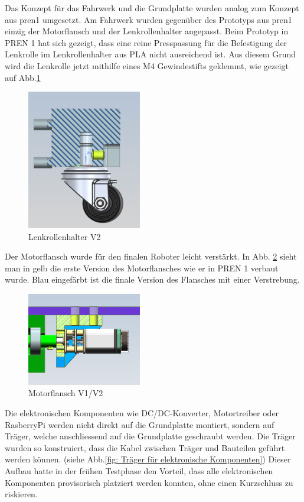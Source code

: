  Das Konzept für das Fahrwerk und die Grundplatte wurden analog zum Konzept aus \acrshort{pren1} umgesetzt. Am Fahrwerk wurden gegenüber des Prototyps aus \acrshort{pren1} einzig der Motorflansch und der Lenkrollenhalter angepasst. Beim Prototyp in PREN 1 hat sich gezeigt, dass eine reine Presspassung für die Befestigung der Lenkrolle im Lenkrollenhalter aus PLA nicht ausreichend ist. Aus diesem Grund wird die Lenkrolle jetzt mithilfe eines M4 Gewindestifts geklemmt, wie gezeigt auf Abb.\ref{fig: Lenkrollenhalter V2} 

\begin{figure}[H]
\centering
\includegraphics[width=5cm]{assets/MT/Lenkrollenhalter V2.png}
\caption{Lenkrollenhalter V2}
\label{fig: Lenkrollenhalter V2}
\end{figure}

Der Motorflansch wurde für den finalen Roboter leicht verstärkt. In  Abb. \ref{fig: Motorflansch V1/V2} sieht man in gelb die erste Version des Motorflansches wie er in PREN 1 verbaut wurde. Blau eingefärbt ist die finale Version des Flansches mit einer Verstrebung. 

\begin{figure}[H]
\centering
\includegraphics[width=5cm]{assets/MT/Motorflansch Vergleich.png}
\caption{Motorflansch V1/V2}
\label{fig: Motorflansch V1/V2}
\end{figure}

Die elektronischen Komponenten wie DC/DC-Konverter, Motortreiber oder RasberryPi werden nicht direkt auf die Grundplatte montiert, sondern auf Träger, welche anschliessend auf die Grundplatte geschraubt werden. Die Träger wurden so konstruiert, dass die Kabel zwischen Träger und Bauteilen geführt werden können. (siehe Abb.\ref{fig: Träger für elektronische Komponenten}) Dieser Aufbau hatte in der frühen Testphase den Vorteil, dass alle elektronischen Komponenten provisorisch platziert werden konnten, ohne einen Kurzschluss zu riskieren. 

